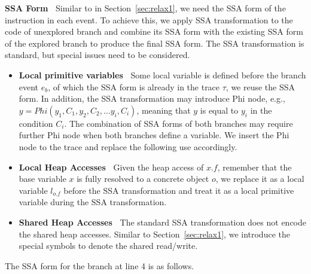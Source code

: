 {\bf SSA Form\ }  Similar to in Section~\ref{sec:relax1}, we need the SSA form of the instruction in each event. To achieve this, we apply SSA transformation to the code of  unexplored branch and combine its SSA form with the existing SSA form of the explored branch to produce the final SSA form. The SSA transformation is standard, but special issues need to be considered.
\begin{itemize}
\item {\bf Local primitive variables\ }  Some local variable is defined before the branch event $e_b$, of which the SSA form is already in the trace $\tau$, we reuse the SSA form.  In addition, the SSA transformation may introduce Phi node, e.g., $y=Phi(y_1, C_1, y_2, C_2, \dots y_i, C_i)$, meaning that $y$ is equal to $y_i$ in the condition $C_i$. The combination of SSA forms of both branches may require further Phi node when both branches define a variable. We insert the Phi node to the trace and replace the following use accordingly.
\item {\bf Local Heap Accesses\ } Given the heap access of $x.f$, remember that the base variable $x$ is fully resolved to a concrete object $o$, we replace it as a local variable $l_{o.f}$ before the SSA transformation and treat it as a local primitive variable during the SSA transformation. 
\item {\bf Shared Heap Accesses\ } The standard SSA transformation does not encode the shared heap accesses. Similar to Section~\ref{sec:relax1}, we introduce the special symbols to denote the shared read/write.
\end{itemize}

The SSA form for the branch at line 4 is as follows. 



